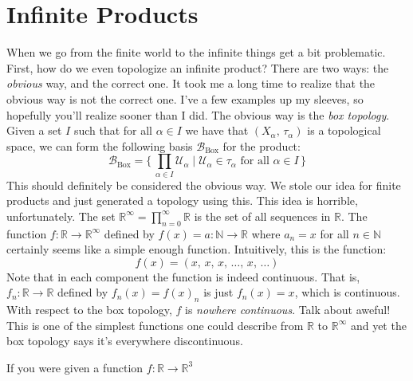 \documentclass{article}
\theoremstyle{plain}
\theoremstyle{normal}
\begin{document}
    \section{Infinite Products}
        When we go from the finite world to the infinite things get a bit
        problematic. First, how do we even topologize an infinite product?
        There are two ways: the \textit{obvious} way, and the correct one.
        It took me a long time to realize that the obvious way is not the
        correct one. I've a few examples up my sleeves, so hopefully you'll
        realize sooner than I did. The obvious way is the
        \textit{box topology}. Given a set $I$ such that for all
        $\alpha\in{I}$ we have that $(X_{\alpha},\,\tau_{\alpha})$ is a
        topological space, we can form the following basis
        $\mathcal{B}_{\textrm{Box}}$ for the product:
        \begin{equation}
            \mathcal{B}_{\textrm{Box}}
            =\Big\{\,\prod_{\alpha\in{I}}\mathcal{U}_{\alpha}\;|\;
                \mathcal{U}_{\alpha}\in\tau_{\alpha}
                \textrm{ for all }\alpha\in{I}\,\Big\}
        \end{equation}
        This should definitely be considered the obvious way. We stole our
        idea for finite products and just generated a topology using this.
        This idea is horrible, unfortunately. The set
        $\mathbb{R}^{\infty}=\prod_{n=0}^{\infty}\mathbb{R}$ is the set of
        all sequences in $\mathbb{R}$. The function
        $f:\mathbb{R}\rightarrow\mathbb{R}^{\infty}$ defined by
        $f(x)=a:\mathbb{N}\rightarrow\mathbb{R}$ where $a_{n}=x$ for all
        $n\in\mathbb{N}$ certainly seems like a simple enough function.
        Intuitively, this is the function:
        \begin{equation}
            f(x)=(x,\,x,\,x,\,\dots,\,x,\,\dots)
        \end{equation}
        Note that in each component the function is indeed continuous.
        That is, $f_{n}:\mathbb{R}\rightarrow\mathbb{R}$ defined by
        $f_{n}(x)=f(x)_{n}$ is just $f_{n}(x)=x$, which is continuous.
        With respect to the box topology, $f$ is \textit{nowhere continuous}.
        Talk about aweful! This is one of the simplest functions one could
        describe from $\mathbb{R}$ to $\mathbb{R}^{\infty}$ and yet the
        box topology says it's everywhere discontinuous.
        \par\hfill\par
        If you were given a function $f:\mathbb{R}\rightarrow\mathbb{R}^{3}$
\end{document}
